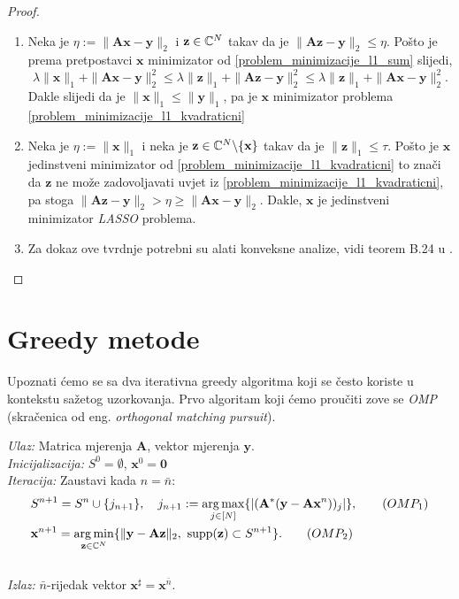 \documentclass[a4paper,twoside,12pt]{memoir} %
\newcommand{\vect}[1]{\mathbf{#1}}
\renewcommand{\vec}{\vect}
\newcommand{\supp}{\text{\normalfont{supp}}}
\newcommand{\norm}[1]{\|{#1}\|}
\DeclareMathOperator*{\argmax}{arg\,max}
\DeclareMathOperator*{\argmin}{arg\,min}
\newenvironment{alg}[1]
{
    \bigskip
    \begin{tcolorbox}[arc=0mm,boxrule=1.2pt,colframe=black,colback=white,detach title, before upper={\medskip\begin{center}\textbf{#1}\end{center}\hline\newline\medskip},frame hidden]
    \medskip
}
{
    \medskip
\end{tcolorbox}
    \bigskip
}
\begin{document}
\begin{proof}
    \begin{enumerate}[label=(\alph*)]
        \item Neka je $\eta := \norm{\vec{Ax}- \vec y}_2$ i $\vec z \in \C^N$ takav da je $\norm{\vec{Az-y}}_2 \leq \eta$. Po\v{s}to je prema pretpostavci $\vec x$ minimizator od \eqref{problem_minimizacije_l1_sum} slijedi,
            \begin{equation*}
                \lambda \norm{\vec x}_1 + \norm{\vec{Ax} -\vec{y}}_2^2 \leq \lambda \norm{\vec z}_1 + \norm{\vec{Az} - \vec{y}}_2^2 \leq \lambda \norm{\vec z}_1 + \norm{\vec{Ax}-\vec y}_2^2.
            \end{equation*}
            Dakle slijedi da je $\norm{\vec x}_1 \leq \norm{\vec{y}}_1$, pa je $\vec x$ minimizator problema \eqref{problem_minimizacije_l1_kvadraticni}

        \item Neka je $\eta := \norm{\vec x}_1$ i neka je $\vec z \in \C^N\backslash\{\vec x\}$ takav da je $\norm{\vec z}_1 \leq \tau$. Po\v{s}to je $\vec x$ jedinstveni minimizator od \eqref{problem_minimizacije_l1_kvadraticni} to zna\v{c}i da $\vec z$ ne mo\v{z}e zadovoljavati uvjet iz \eqref{problem_minimizacije_l1_kvadraticni}, pa stoga $\norm{\vec{Az}- \vec{y}}_2 > \eta \geq \norm{\vec{Ax}-\vec y}_2$. Dakle, $\vec x$ je jedinstveni minimizator \textit{LASSO} problema.
        \item Za dokaz ove tvrdnje potrebni su alati konveksne analize, vidi teorem B.24 u \cite{foucart13}.
    \end{enumerate}
\end{proof}

\section[Greedy metode][Greedy metode]{Greedy metode}
Upoznati \'cemo se sa dva iterativna greedy algoritma koji se \v{c}esto koriste u kontekstu sa\v{z}etog uzorkovanja. Prvo algoritam koji \'cemo prou\v{c}iti zove se \textit{OMP} (skra\v{c}enica od eng. \textit{orthogonal matching pursuit}).
\begin{alg}{OMP}
    \textit{Ulaz:} Matrica mjerenja $\vec A$, vektor mjerenja $\vec y$. \\
    \textit{Inicijalizacija:} $S^0 = \emptyset$, $\vec x^0 = \vec 0$ \\
    \textit{Iteracija:} Zaustavi kada $n = \bar{n}$:
        \begin{align}
            &S^{n+1} = S^n \cup \{j_{n+1}\},\quad j_{n+1} := \argmax\limits_{j \in [N]}\{|(\vec A^*(\vec y - \vec{Ax}^n))_j|\},\tag{$OMP_1$}\label{omp_1}
        \\
            &\vec x^{n+1} = \argmin\limits_{\vec z \in \C^N}\{\norm{\vec y - \vec{Az}}_2,\ \supp(\vec z) \subset S^{n+1}\}.\tag{$OMP_2$}\label{omp_2}
        \end{align} \\
        \textit{Izlaz:} $\bar{n}$-rijedak vektor $\vec x^{\sharp}=\vec{x}^{\bar{n}}$.
\end{alg}
\end{document}
